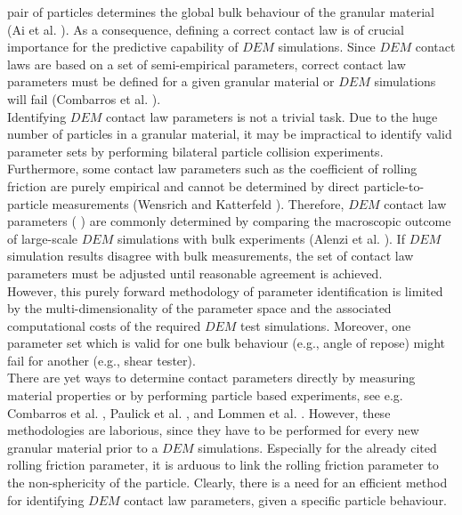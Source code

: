 pair of particles determines the global bulk behaviour of the granular material (Ai et al. \cite{RefWorks:131}). 
As a consequence, defining a correct contact law is of crucial importance for the predictive 
capability of $DEM$ simulations. 
Since $DEM$ contact laws are based 
on a set of semi-empirical parameters, correct contact law 
parameters must be defined for a given granular material
or $DEM$ simulations will fail (Combarros et al. \cite{RefWorks:177}). \\
Identifying $DEM$ contact law parameters is not a trivial task. 
Due to the huge number of particles in a granular material, it
may be impractical to identify valid parameter sets by performing bilateral 
particle collision experiments. 
Furthermore, some contact law parameters such as the coefficient of rolling
friction are purely empirical and cannot be determined by direct 
particle-to-particle measurements (Wensrich and Katterfeld \cite{RefWorks:87}).
Therefore, $DEM$ contact law parameters (
) are
commonly determined by comparing the macroscopic outcome of large-scale $DEM$
simulations with bulk experiments (Alenzi et al. \cite{RefWorks:91}). 
If $DEM$ simulation results disagree with bulk measurements, the set of contact
law parameters must be adjusted until reasonable agreement is achieved.\\
However, this purely forward methodology of parameter identification is limited by 
the multi-dimensionality of the parameter space and the associated computational costs of the required 
$DEM$ test simulations. 
Moreover, one parameter set which is valid for one bulk behaviour (e.g., angle
of repose) might fail for another (e.g., shear tester). \\
There are yet ways to determine contact parameters directly by measuring
material properties or by performing particle based experiments, see e.g. Combarros et al. \cite{RefWorks:177}, 
Paulick et al. \cite{RefWorks:181}, and Lommen et al. \cite{RefWorks:186}. 
However, these methodologies are laborious, 
since they have to be performed for every new granular material prior to a $DEM$
simulations. 
Especially for the already cited rolling friction parameter, it is arduous to
link the rolling friction parameter to the non-sphericity of the particle. Clearly, there is a
need for an efficient method for identifying $DEM$ contact law parameters, given
a specific particle behaviour.